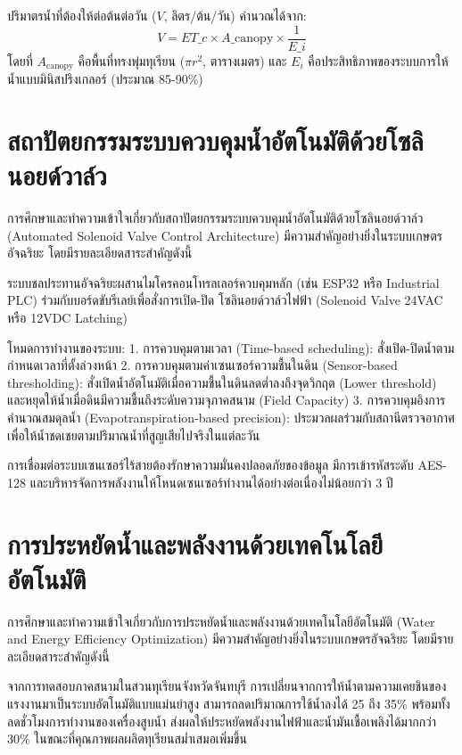 ปริมาตรน้ำที่ต้องให้ต่อต้นต่อวัน ($V$, ลิตร/ต้น/วัน) คำนวณได้จาก:
\[ V = ET\_c \times A\_{\text{canopy}} \times \frac{1}{E\_i} \]
โดยที่ $A_{\text{canopy}}$ คือพื้นที่ทรงพุ่มทุเรียน ($\pi r^2$, ตารางเมตร) และ $E_i$ คือประสิทธิภาพของระบบการให้น้ำแบบมินิสปริงเกลอร์ (ประมาณ 85-90\%)

\section{สถาปัตยกรรมระบบควบคุมน้ำอัตโนมัติด้วยโซลินอยด์วาล์ว}

การศึกษาและทำความเข้าใจเกี่ยวกับสถาปัตยกรรมระบบควบคุมน้ำอัตโนมัติด้วยโซลินอยด์วาล์ว (Automated Solenoid Valve Control Architecture) มีความสำคัญอย่างยิ่งในระบบเกษตรอัจฉริยะ โดยมีรายละเอียดสาระสำคัญดังนี้

ระบบชลประทานอัจฉริยะผสานไมโครคอนโทรลเลอร์ควบคุมหลัก (เช่น ESP32 หรือ Industrial PLC) ร่วมกับบอร์ดขับรีเลย์เพื่อสั่งการเปิด-ปิด โซลินอยด์วาล์วไฟฟ้า (Solenoid Valve 24VAC หรือ 12VDC Latching)

โหมดการทำงานของระบบ:
1. การควบคุมตามเวลา (Time-based scheduling): สั่งเปิด-ปิดน้ำตามกำหนดเวลาที่ตั้งล่วงหน้า
2. การควบคุมตามค่าเซนเซอร์ความชื้นในดิน (Sensor-based thresholding): สั่งเปิดน้ำอัตโนมัติเมื่อความชื้นในดินลดต่ำลงถึงจุดวิกฤต (Lower threshold) และหยุดให้น้ำเมื่อดินมีความชื้นถึงระดับความจุภาคสนาม (Field Capacity)
3. การควบคุมอิงการคำนวณสมดุลน้ำ (Evapotranspiration-based precision): ประมวลผลร่วมกับสถานีตรวจอากาศเพื่อให้น้ำชดเชยตามปริมาณน้ำที่สูญเสียไปจริงในแต่ละวัน

\begin{techbox}
การเชื่อมต่อระบบเซนเซอร์ไร้สายต้องรักษาความมั่นคงปลอดภัยของข้อมูล มีการเข้ารหัสระดับ AES-128 และบริหารจัดการพลังงานให้โหนดเซนเซอร์ทำงานได้อย่างต่อเนื่องไม่น้อยกว่า 3 ปี
\end{techbox}

\section{การประหยัดน้ำและพลังงานด้วยเทคโนโลยีอัตโนมัติ}

การศึกษาและทำความเข้าใจเกี่ยวกับการประหยัดน้ำและพลังงานด้วยเทคโนโลยีอัตโนมัติ (Water and Energy Efficiency Optimization) มีความสำคัญอย่างยิ่งในระบบเกษตรอัจฉริยะ โดยมีรายละเอียดสาระสำคัญดังนี้

จากการทดสอบภาคสนามในสวนทุเรียนจังหวัดจันทบุรี การเปลี่ยนจากการให้น้ำตามความเคยชินของแรงงานมาเป็นระบบอัตโนมัติแบบแม่นยำสูง สามารถลดปริมาณการใช้น้ำลงได้ 25 ถึง 35\% พร้อมทั้งลดชั่วโมงการทำงานของเครื่องสูบน้ำ ส่งผลให้ประหยัดพลังงานไฟฟ้าและน้ำมันเชื้อเพลิงได้มากกว่า 30\% ในขณะที่คุณภาพผลผลิตทุเรียนสม่ำเสมอเพิ่มขึ้น

